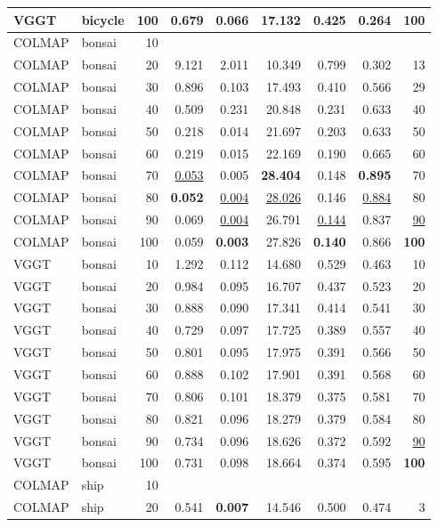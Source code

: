 \begin{table}[H]
\begin{tabular}{llrrrrrrr}
VGGT & bicycle & 100 & 0.679 & 0.066 & 17.132 & 0.425 & 0.264 & \textbf{100} \\
\midrule
COLMAP & bonsai & 10 &  &  &  &  &  &  \\
COLMAP & bonsai & 20 & 9.121 & 2.011 & 10.349 & 0.799 & 0.302 & 13 \\
COLMAP & bonsai & 30 & 0.896 & 0.103 & 17.493 & 0.410 & 0.566 & 29 \\
COLMAP & bonsai & 40 & 0.509 & 0.231 & 20.848 & 0.231 & 0.633 & 40 \\
COLMAP & bonsai & 50 & 0.218 & 0.014 & 21.697 & 0.203 & 0.633 & 50 \\
COLMAP & bonsai & 60 & 0.219 & 0.015 & 22.169 & 0.190 & 0.665 & 60 \\
COLMAP & bonsai & 70 & \underline{0.053} & 0.005 & \textbf{28.404} & 0.148 & \textbf{0.895} & 70 \\
COLMAP & bonsai & 80 & \textbf{0.052} & \underline{0.004} & \underline{28.026} & 0.146 & \underline{0.884} & 80 \\
COLMAP & bonsai & 90 & 0.069 & \underline{0.004} & 26.791 & \underline{0.144} & 0.837 & \underline{90} \\
COLMAP & bonsai & 100 & 0.059 & \textbf{0.003} & 27.826 & \textbf{0.140} & 0.866 & \textbf{100} \\
VGGT & bonsai & 10 & 1.292 & 0.112 & 14.680 & 0.529 & 0.463 & 10 \\
VGGT & bonsai & 20 & 0.984 & 0.095 & 16.707 & 0.437 & 0.523 & 20 \\
VGGT & bonsai & 30 & 0.888 & 0.090 & 17.341 & 0.414 & 0.541 & 30 \\
VGGT & bonsai & 40 & 0.729 & 0.097 & 17.725 & 0.389 & 0.557 & 40 \\
VGGT & bonsai & 50 & 0.801 & 0.095 & 17.975 & 0.391 & 0.566 & 50 \\
VGGT & bonsai & 60 & 0.888 & 0.102 & 17.901 & 0.391 & 0.568 & 60 \\
VGGT & bonsai & 70 & 0.806 & 0.101 & 18.379 & 0.375 & 0.581 & 70 \\
VGGT & bonsai & 80 & 0.821 & 0.096 & 18.279 & 0.379 & 0.584 & 80 \\
VGGT & bonsai & 90 & 0.734 & 0.096 & 18.626 & 0.372 & 0.592 & \underline{90} \\
VGGT & bonsai & 100 & 0.731 & 0.098 & 18.664 & 0.374 & 0.595 & \textbf{100} \\
\midrule
COLMAP & ship & 10 &  &  &  &  &  &  \\
COLMAP & ship & 20 & 0.541 & \textbf{0.007} & 14.546 & 0.500 & 0.474 & 3 \\

\end{tabular}
\end{table}
